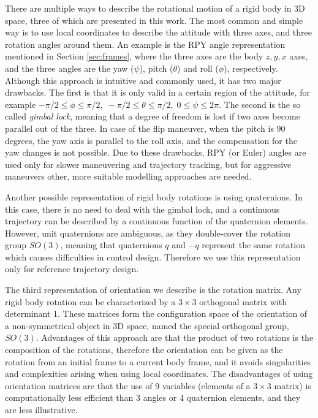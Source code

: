 There are multiple ways to describe the rotational motion of a rigid body in 3D space, three of which are presented in this work. The most common and simple way is to use local coordinates to describe the attitude with three axes, and three rotation angles around them. An example is the RPY angle representation mentioned in Section \ref{sec:frames}, where the three axes are the body $z, y, x$ axes, and the three angles are the yaw ($\psi$), pitch ($\theta$) and roll ($\phi$), respectively. Although this approach is intuitive and commonly used, it has two major drawbacks. The first is that it is only valid in a certain region of the attitude, for example $-\pi/2 \leq \phi \leq \pi/2,\; -\pi/2 \leq \theta \leq \pi/2,\; 0 \leq \psi \leq 2\pi$. The second is the so called \textit{gimbal lock}, meaning that a degree of freedom is lost if two axes become parallel out of the three. In case of the flip maneuver, when the pitch is 90 degrees, the yaw axis is parallel to the roll axis, and the compensation for the yaw changes is not possible. Due to these drawbacks, RPY (or Euler) angles are used only for slower maneuvering and trajectory tracking, but for aggressive maneuvers other,  more suitable modelling approaches are needed.

Another possible representation of rigid body rotations is using quaternions. In this case, there is no need to deal with the gimbal lock, and a continuous trajectory can be described by a continuous function of the quaternion elements. However, unit quaternions are ambiguous, as they double-cover the rotation group $SO(3)$, meaning that quaternions $q$ and $-q$ represent the same rotation which causes difficulties in control design. Therefore we use this representation only for reference trajectory design.

The third representation of orientation we describe is the rotation matrix. Any rigid body rotation can be characterized by a $3\times 3$ orthogonal matrix with determinant 1. These matrices form the configuration space of the orientation of a non-symmetrical object in 3D space, named the special orthogonal group, $SO(3)$. Advantages of this approach are that the product of two rotations is the composition of the rotations, therefore the orientation can be given as the rotation from an initial frame to a current body frame, and it avoids singularities and complexities arising when using local coordinates. The disadvantages of using orientation matrices are that the use of 9 variables (elements of a $3\times 3$ matrix) is computationally less efficient than 3 angles or 4 quaternion elements, and they are less illustrative.

